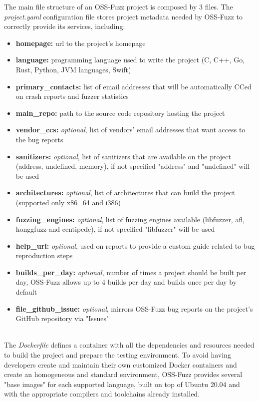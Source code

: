 \newpage
The main file structure of an OSS-Fuzz project is composed by 3 files.
\newline \newline
The \textit{project.yaml} configuration file stores project metadata needed by OSS-Fuzz to correctly provide its services, including:
\begin{itemize}
    \item \textbf{homepage:} url to the project's homepage
    \item \textbf{language:} programming language used to write the project (C, C++, Go, Rust, Python, JVM languages, Swift)
    \item \textbf{primary\_contacts:} list of email addresses that will be automatically CCed on crash reports and fuzzer statistics
    \item \textbf{main\_repo:} path to the source code repository hosting the project
    \item \textbf{vendor\_ccs:} \textit{optional}, list of vendors' email addresses that want access to the bug reports
    \item \textbf{sanitizers:} \textit{optional}, list of sanitizers that are available on the project (address, undefined, memory), if not specified "address" and "undefined" will be used
    \item \textbf{architectures:} \textit{optional}, list of architectures that can build the project (supported only x86\_64 and i386)
    \item \textbf{fuzzing\_engines:} \textit{optional}, list of fuzzing engines available (libfuzzer, afl, honggfuzz and centipede), if not specified "libfuzzer" will be used
    \item \textbf{help\_url:} \textit{optional}, used on reports to provide a custom guide related to bug reproduction steps
    \item \textbf{builds\_per\_day:} \textit{optional}, number of times a project should be built per day, OSS-Fuzz allows up to 4 builds per day and builds once per day by default
    \item \textbf{file\_github\_issue:} \textit{optional}, mirrors OSS-Fuzz bug reports on the project's GitHub repository via "Issues"
\end{itemize}
\ \\
The \textit{Dockerfile} defines a container with all the dependencies and resources needed to build the project and prepare the testing environment.
\newline
To avoid having developers create and maintain their own customized Docker containers and create an homogeneous and standard environment, OSS-Fuzz provides several "base images" for each supported language, built on top of Ubuntu 20.04 and with the appropriate compilers and toolchains already installed.
